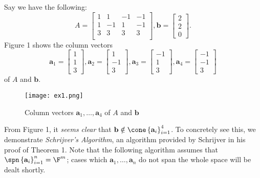 \documentclass{article}
\renewcommand{\vec}{\mathbf}
\begin{document}
Say we have the following:
\begin{equation}
    A =
    \begin{bmatrix}
    	1 & 1 & -1 & -1 \\
    	1 & -1 & 1 & -1 \\
    	3 & 3 & 3 & 3 \\
    \end{bmatrix},
    \vec{b} = \begin{bmatrix} 2 \\ 2\\ 0 \end{bmatrix}.
\end{equation}
Figure 1 shows the column vectors
\begin{equation*}
    \vec{a}_1 = \begin{bmatrix} 1\\1\\3 \end{bmatrix} , \vec{a}_2 = \begin{bmatrix} 1\\-1\\3 \end{bmatrix} , \vec{a}_3 = \begin{bmatrix} -1\\1\\3 \end{bmatrix}, \vec{a}_4 = \begin{bmatrix} -1\\-1\\3 \end{bmatrix} 
\end{equation*}
of $A$ and $\vec{b}$.

\begin{figure}
    \center
    \caption{Column vectors $\vec{a}_1,\ldots,\vec{a}_4$ of $A$ and $\vec{b}$}
    \texttt{[image: ex1.png]}
\end{figure}

From Figure 1, it \textit{seems clear} that $\vec{b}\notin\cone\left\lbrace \vec{a}_{i} \right\rbrace^{4}_{i=1}$. To concretely see this, we demonstrate \textit{Schrijver's Algorithm}, an algorithm provided by Schrijver\cite{TLIP} in his proof of Theorem 1. Note that the following algorithm assumes that $\spn\left\lbrace \vec{a}_i \right\rbrace ^{n}_{i=1} = \F^m$; cases which $\vec{a}_1,\ldots,\vec{a}_n$ do not span the whole space will be dealt shortly.
\end{document}
